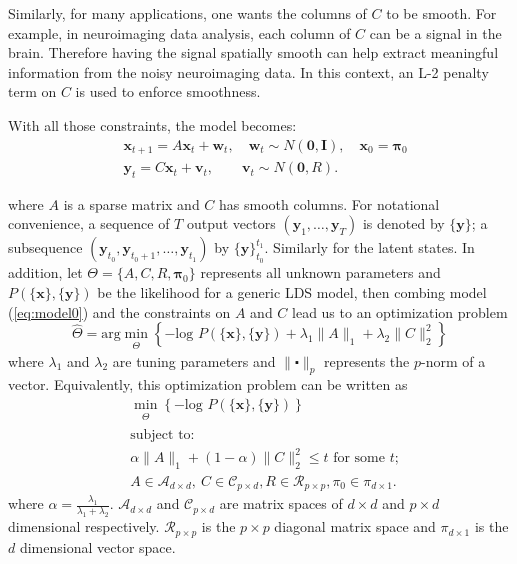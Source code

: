 \documentclass[fleqn]{article}
\let\oldref\ref
\renewcommand{\ref}[1]{(\oldref{#1})}
\begin{document}
Similarly, for many applications, one wants the columns of $C$ to be smooth. For example, in neuroimaging data analysis, each column of $C$ can be a signal in the brain. Therefore having the signal spatially smooth can help extract meaningful information from the noisy neuroimaging data. In this context, an L-2 penalty term on $C$ is used to enforce smoothness.

With all those constraints, the model becomes:
\begin{equation}\label{eq:model0}
\begin{aligned}
	&\mathbf{x}_{t+1}=A\mathbf{x}_{t}+\mathbf{w}_t, \quad \mathbf{w}_t\sim N(\mathbf{0},\mathbf{I}),\quad \mathbf{x}_0 = \mathbf{\pi}_0\\
	&\mathbf{y}_t=C\mathbf{x}_t+\mathbf{v}_t,\qquad \mathbf{v}_t\sim N(\mathbf{0},R).
\end{aligned}
\end{equation}

where $A$ is a sparse matrix and $C$ has smooth columns. For notational convenience, a sequence of $T$ output vectors $(\mathbf{y}_1,\ldots,\mathbf{y}_T)$ is denoted by $\{\mathbf{y}\}$; a subsequence $(\mathbf{y}_{t_0},\mathbf{y}_{t_0 + 1},\ldots,\mathbf{y}_{t_1})$ by $\{\mathbf{y}\}_{t_0}^{t_1}$. Similarly for the latent states. In addition, let $\Theta =\{A,C,R,\mathbf{\pi}_0\}$ represents all unknown parameters and $P(\{\mathbf{x}\},\{\mathbf{y}\})$ be the likelihood for a generic LDS model, then combing model \ref{eq:model0} and the constraints on $A$ and $C$ lead us to an optimization problem
\begin{equation}\label{eqn:penaltylik}
\hat{\Theta}=\text{arg}\min_{\substack{\Theta}}\left\{-\text{log }P(\{\textbf{x}\},\{\textbf{y}\})+\lambda_1\|A\|_1+\lambda_2\|C\|_2^2\right\}
\end{equation}
where $\lambda_1$ and $\lambda_2$ are tuning parameters and $\|\centerdot\|_p$ represents the $p$-norm of a vector. Equivalently, this optimization problem can be written as
\begin{equation}\label{eqn:penaltylikdual}
\begin{aligned}
&\min_{\substack{\Theta}}\left\{-\text{log }P(\{\textbf{x}\},\{\textbf{y}\})\right\}\\
&\text{subject to: }\\
&\alpha\|A\|_1+ (1-\alpha)\|C\|_2^2 \leq t \text{ for some }t;\\
&A\in \mathcal{A}_{d\times d},\ C \in \mathcal{C}_{p \times d}, R \in \mathcal{R}_{p\times p}, \pi_0 \in \mathcal{\pi}_{d\times 1}.
\end{aligned}
\end{equation}
where $\alpha = \frac{\lambda_1}{\lambda_1 + \lambda_2}$. $\mathcal{A}_{d\times d}$ and $\mathcal{C}_{p \times d}$ are matrix spaces of $d\times d$ and $p \times d$ dimensional respectively. $\mathcal{R}_{p \times p}$ is the $p \times p$ diagonal matrix space and $\mathcal{\pi}_{d\times 1}$ is the $d$ dimensional vector space.  
\end{document}

